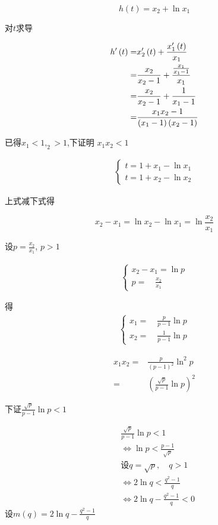 \documentclass[12pt,a4paper]{article}
\renewcommand{\(}{\left(}
\renewcommand{\)}{\right)}
\newcommand{\lra}{\Leftrightarrow}
\begin{document}
$$h\(t\)=x_2+ \ln{x_1}$$

对$t$求导
 
\begin{align}\label{a5}
h'\(t\)=& x_2'\(t\)+ \frac{x_1'\(t\)}{x_1} \notag \\
=& \frac{x_2}{x_2-1}+ \frac{\frac{x_1}{x_1-1}}{x_1} \notag\\
=&\frac{x_2}{x_2-1}+\frac{1}{x_1-1}\notag\\
=&\frac{x_1x_2-1}{\( x_1-1\)\( x_2-1\)}
\end{align}


已得$x_1<1{}, _2>1$,下证明{ }$x_1x_2{ }<{ }1$

\begin{align*}
\begin{cases}
t=1+x_1- \ln{x_1}\\
t=1+x_2- \ln{x_2}
\end{cases}
\end{align*}

上式减下式得

$$x_2-x_1 = \ln{x_2}-\ln{x_1}=\ln{\frac{x_2}{x_1}}$$

设$p=  \frac{x_2}{x_1}$,{ }$p>1$

\begin{align*}
\begin{cases}
x_2-x_1 =\ln{p} \\
p= \quad \frac{x_2}{x_1}
\end{cases}
\end{align*}

得
\begin{align*}
\begin{cases}
x_1=\quad \frac{p}{p-1} \ln{p}\\
x_2=\quad \frac{1}{p-1} \ln{p}
\end{cases}
\end{align*}


\begin{equation} \label{a6}
\begin{split}
x_1x_2=&\frac{p}{\(p-1\)^2} \ln^2{p}\\
=& \( \frac{ \sqrt{p}}{p-1} \ln{p}\)^2
\end{split}
\end{equation}

下证$\frac{ \sqrt{p}}{p-1} \ln{p} < 1$

\begin{equation} \label{a7}
\begin{split}
& \frac{ \sqrt{p}}{p-1} \ln{p} < 1\\
& \lra \ln{p}<\frac{p-1}{ \sqrt{p}}\\
& \text{设} q=\sqrt{p},\quad q>1\\
& \lra 2\ln{q} <\frac{q^2-1}{q}\\
& \lra 2\ln{q}-\frac{q^2-1}{q}<0
\end{split}
\end{equation}
设$m \(q \)= 2\ln{q}-\frac{q^2-1}{q}$
	
\end{document}

